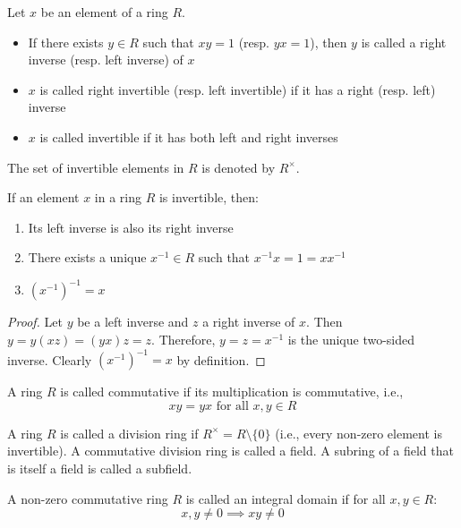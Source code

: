 \begin{definition}
  Let $x$ be an element of a ring $R$.
  \begin{itemize}
    \item If there exists $y \in R$ such that $xy = 1$ (resp. $yx = 1$), then $y$ is called a right inverse (resp. left inverse) of $x$
    \item $x$ is called right invertible (resp. left invertible) if it has a right (resp. left) inverse
    \item $x$ is called invertible if it has both left and right inverses
  \end{itemize}
  The set of invertible elements in $R$ is denoted by $R^\times$.
\end{definition}

\begin{proposition}
  If an element $x$ in a ring $R$ is invertible, then:
  \begin{enumerate}
    \item Its left inverse is also its right inverse
    \item There exists a unique $x^{-1} \in R$ such that $x^{-1}x = 1 = xx^{-1}$
    \item $(x^{-1})^{-1} = x$
  \end{enumerate}
\end{proposition}

\begin{proof}
  Let $y$ be a left inverse and $z$ a right inverse of $x$.
  Then $y = y(xz) = (yx)z = z$.
  Therefore, $y = z = x^{-1}$ is the unique two-sided inverse.
  Clearly $(x^{-1})^{-1} = x$ by definition.
\end{proof}

\begin{definition}
  A ring $R$ is called commutative if its multiplication is commutative, i.e.,
  \[
    xy = yx \text{ for all } x,y \in R
  \]
\end{definition}

\begin{definition}
  A ring $R$ is called a division ring if $R^\times = R \setminus \{0\}$ (i.e., every non-zero element is invertible).
  A commutative division ring is called a field.
  A subring of a field that is itself a field is called a subfield.
\end{definition}

\begin{definition}
  A non-zero commutative ring $R$ is called an integral domain if for all $x,y \in R$:
  \[
    x,y \neq 0 \implies xy \neq 0
  \]
\end{definition}

